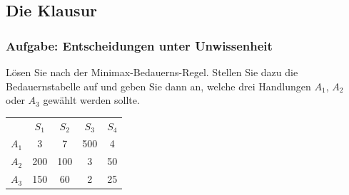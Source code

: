 \subsection{Die Klausur}

\subsubsection*{Aufgabe: Entscheidungen unter Unwissenheit}



Lösen Sie nach der Minimax-Bedauerns-Regel. Stellen Sie dazu die
Bedauernstabelle auf und geben Sie dann an, welche drei Handlungen $A_1$, $A_2$
oder $A_3$ gewählt werden sollte.
\begin{center}
\begin{tabular}{c|c|c|c|c|}
\multicolumn{1}{c}{} & \multicolumn{1}{c}{$S_1$}
& \multicolumn{1}{c}{$S_2$} & \multicolumn{1}{c}{$S_3$}
& \multicolumn{1}{c}{$S_4$}
\\ \cline{2-5}
$A_1$ &   3 &   7  &  500 &  4 \\ \cline{2-5} 
$A_2$ & 200 &  100 &    3 & 50 \\ \cline{2-5}
$A_3$ & 150 &   60 &    2 & 25 \\ \cline{2-5}
\end{tabular}
\end{center}


